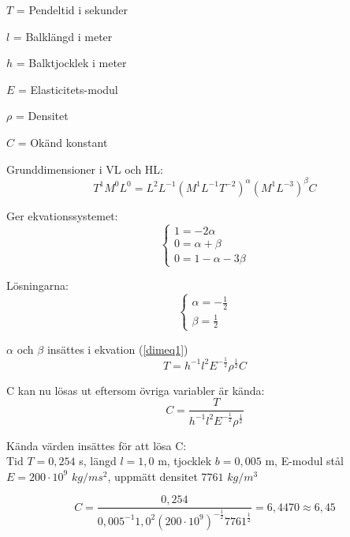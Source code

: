\documentclass[10pt, titlepage, oneside, a4paper]{article}
\begin{document}
\begin{description}
 \item $T$ = Pendeltid i sekunder
 \item $l$ = Balklängd i meter
 \item $h$ = Balktjocklek i meter
 \item $E$ = Elasticitets-modul
 \item $\rho$ = Densitet
 \item $C$ = Okänd konstant
\end{description}

\vspace{10pt}



Grunddimensioner i VL och HL:
\begin{equation}
T^1M^0L^0= L^2  L^{-1} (M^1L^{-1}T^{-2})^\alpha   (M^1L^{-3})^\beta  C
\end{equation}


Ger ekvationssystemet:
\begin{equation}
\begin{cases}
   1 = -2\alpha \\
   0 = \alpha + \beta \\
   0 = 1 - \alpha - 3\beta
\end{cases}
\end{equation}


Lösningarna:
\begin{equation}
\begin{cases}
   \alpha = -\frac{1}{2}\\
   \beta = \frac{1}{2}
\end{cases}
\end{equation}


$\alpha$ och $\beta$ insättes i ekvation (\ref{dimeq1})
\begin{equation}
T=h^{-1}   l^2  E^{-\frac{1}{2}}  \rho ^\frac{1}{2}  C
\end{equation}

C kan nu lösas ut eftersom övriga variabler är kända:
\begin{equation}
C=\frac{T}{h^{-1}   l^2  E^{-\frac{1}{2}}  \rho ^\frac{1}{2}}
\end{equation}

Kända värden insättes för att lösa C:\\
Tid $T=0,254$ s, längd $l=1,0$ m, tjocklek $b=0,005$ m, E-modul stål $E=200\cdot 10^9$ $kg/ms^2$, uppmätt densitet $7761$ $kg/m^3$

\begin{equation}
C=\frac{0,254}{0,005^{-1}   1,0^2  (200\cdot 10^9)^{-\frac{1}{2}}  7761^\frac{1}{2}} = 6,4470 \approx 6,45
\end{equation}
\end{document}
